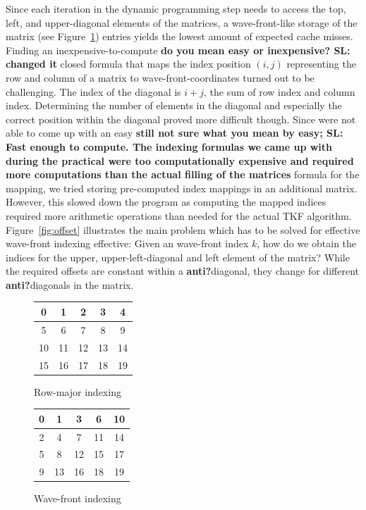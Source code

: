 \documentclass[runningheads,a4paper]{llncs}
\begin{document}
Since each iteration in the dynamic programming step needs to access the top, left, and upper-diagonal elements of the matrices, 
a wave-front-like storage of the matrix (see Figure~\ref{fig:wavefront}) entries yields the lowest amount of expected cache misses. 
Finding an inexpensive-to-compute {\bf do you mean easy or inexpensive? SL: changed it} closed formula that maps the index position $(i,j)$ representing the row and column of a matrix 
to wave-front-coordinates turned out to be challenging. 
The index of the diagonal is $i+j$, the sum of row index and column index. 
Determining the number of elements in the diagonal and especially the correct position within the diagonal proved more difficult though.
Since were not able to come up with an easy {\bf still not sure what you mean by easy; SL: Fast enough to compute. The indexing formulas we came up with during the practical were too computationally expensive and required more computations than the actual filling of the matrices} formula for the mapping, 
we tried storing pre-computed index mappings in an additional matrix. 
However, this slowed down the program as computing the mapped indices required more arithmetic operations than needed for the actual TKF algorithm.
Figure~\ref{fig:offset} illustrates the main problem which has to be solved 
for effective wave-front indexing effective: Given an wave-front index $k$, how do we obtain the indices for the upper, upper-left-diagonal and left element of the matrix? 
While the required offsets are constant within a {\bf anti?}diagonal, they change for different {\bf anti?}diagonals in the matrix.

\begin{figure}

\begin{minipage}{0.5\textwidth}
\centering
\begin{tabular}{|c|c|c|c|c|}
\hline 
0 & 1 & 2 & 3 & 4 \\ 
\hline 
5 & 6 & 7 & 8 & 9 \\ 
\hline 
10 & 11 & 12 & 13 & 14 \\ 
\hline 
15 & 16 & 17 & 18 & 19 \\ 
\hline
\end{tabular}
\caption{Row-major indexing}
\label{fig:rowmajor}
\end{minipage}
\begin{minipage}{0.5\textwidth}
\centering
\begin{tabular}{|c|c|c|c|c|}
\hline 
0 & 1 & 3 & 6 & 10 \\ 
\hline 
2 & 4 & 7 & 11 & 14 \\ 
\hline 
5 & 8 & 12 & 15 & 17 \\ 
\hline 
9 & 13 & 16 & 18 & 19 \\ 
\hline 
\end{tabular}
\caption{Wave-front indexing}
\label{fig:wavefront}
\end{minipage}
\end{figure}
\end{document}
